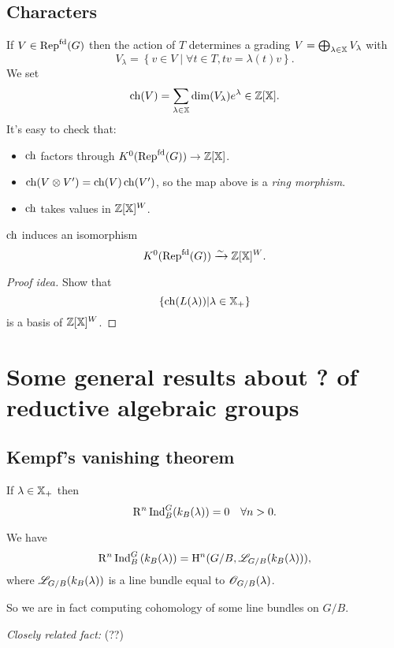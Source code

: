 	\subsection{Characters}
	If $V\in \operatorname{Rep}^{\text{fd}}(G)$ then the action of $T$ determines a grading $V=\bigoplus_{\lambda\in
	\mathbb{X}}V_\lambda$ with
	\[
		V_\lambda = \left\{ v\in V \middle| \forall t\in T,tv = \lambda(t)v \right\} .
	\]
	We set
	\[
		\operatorname{ch}(V) = \sum_{\lambda\in \mathbb{X}}\dim(V_\lambda)e^{\lambda}\in \mathbb Z[\mathbb{X}].
	\]
	It's easy to check that:
	\begin{itemize}
		\item $\operatorname{ch}$ factors through $K^{0}(\Repf(G))\to \Z[\XX]$.
		\item $\operatorname{ch}(V\otimes V') = \operatorname{ch}(V)\operatorname{ch}(V')$, so the map above is a \emph{ring morphism}.
		\item $\operatorname{ch}$ takes values in $\mathbb Z[\mathbb{X}]^{W}$.
	\end{itemize}
	\begin{proposition}
		$\operatorname{ch}$ induces an isomorphism
		\[
			K^{0}(\operatorname{Rep}^{\text{fd}}(G)) \xrightarrow{\sim} \mathbb Z[\mathbb{X}]^{W}.
		\]
	\end{proposition}
	\begin{proof}[Proof idea]
		Show that
		\[
			\left\{ \operatorname{ch}(L(\lambda)) \middle| \lambda\in \mathbb{X}_+ \right\}
		\]
		is a basis of $\mathbb Z[\mathbb{X}]^{W}$.
	\end{proof}

	\section{Some general results about ? of reductive algebraic groups}
	\subsection{Kempf's vanishing theorem}
	\begin{theorem}
		If $\lambda\in \mathbb{X}_+$ then
		\[
			\mathrm{R}^{n}\operatorname{Ind}_B^{G}(k_B(\lambda)) = 0 \quad \forall n>0.
		\]
	\end{theorem}
	\begin{note}
		We have
		\[
			\mathrm{R}^{n}\operatorname{Ind}_B^{G}\left( k_B(\lambda) \right) = \mathrm{H}^{n}(G /B, \mathscr{L}_{G /B}(k_B(\lambda))),
		\]
		where $\mathscr{L}_{G /B}(k_B(\lambda))$ is a line bundle equal to $\mathscr{O}_{G /B}(\lambda)$.
	\end{note}
	So we are in fact computing cohomology of some line bundles on $G /B$.

	\emph{Closely related fact:} (??)

